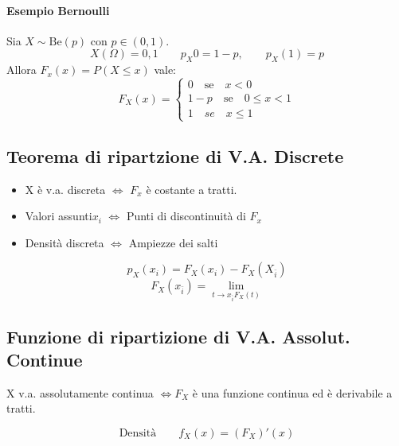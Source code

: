 \paragraph*{Esempio Bernoulli} Sia $X \sim \text{Be}(p)$ con $p \in (0,1)$.
\begin{equation*}
    X(\Omega) = {0, 1} \qquad p_X{0}=1-p, \qquad p_X(1) = p
\end{equation*}
Allora $F_x(x) = P(X \leq x)$ vale:
\begin{equation*}
    F_X(x) =
    \begin{cases}
        0 \quad \text{se} \quad x < 0 \\
        1-p \quad \text{se} \quad 0 \leq x < 1 \\
        1 \quad se \quad x \leq 1
    \end{cases}
\end{equation*}

\subsection*{Teorema di ripartzione di V.A. Discrete}
\begin{itemize}
    \item X è v.a. discreta $\Leftrightarrow$ $F_x$ è costante a tratti.
    \item Valori assunti{$x_i$} $\Leftrightarrow$ Punti di discontinuità  di $F_x$
    \item Densità discreta $\Leftrightarrow$ Ampiezze dei salti
\end{itemize}
\begin{equation*}
    p_X (x_i) = F_X(x_i) - F_X(X_{\bar{i}})
\end{equation*}
\begin{equation*}
    F_X(x_{\bar{i}}) = \lim_{t \to x_{\bar{i}} F_X(t)}  
\end{equation*}
\subsection*{Funzione di ripartizione di V.A. Assolut. Continue}
X v.a. assolutamente continua $\Leftrightarrow F_X$ è una funzione continua ed
è derivabile a tratti.

\begin{equation}
    \text{Densità} \qquad f_X(x) = (F_X)'(x)
\end{equation}

